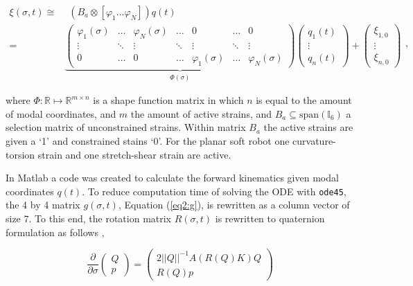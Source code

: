 \begin{equation}
\begin{aligned}
    \xi(\sigma,t) \cong & \hspace{5pt}  (B_a \otimes [ \varphi_1 \dots \varphi_N ])q(t)\\ = &  \underbrace{ \begin{pmatrix}
    \varphi_1(\sigma) & \dots  & \varphi_N(\sigma) & \dots     & 0      & \dots  &  0 \\
    \vdots    & \ddots & \vdots    & \ddots    & \vdots & \ddots & \vdots \\
    0         & \dots  & 0         & \dots     & \varphi_1(\sigma) & \dots & \varphi_N (\sigma)
    \end{pmatrix}}_{\Phi(\sigma)} \begin{pmatrix} q_1(t) \\ \vdots \\ q_n(t) \end{pmatrix} +  \begin{pmatrix} \xi_{1,0} \\ \vdots \\ \xi_{n,0}   \end{pmatrix}
    \end{aligned},
\label{eq2:xishape}
\end{equation}

where $\Phi : \mathbb{R} \mapsto \mathbb{R}^{m \times n}$ is a shape function matrix in which $n$ is equal to the amount of modal coordinates, and $m$ the amount of active strains, and $B_a \subseteq \text{span}(\mathbb{I}_6)$ a selection matrix of unconstrained strains. Within matrix $B_a$ the active strains are given a `1' and constrained stains `0'. For the planar soft robot one curvature-torsion strain and one stretch-shear strain are active. 


In Matlab \cite{MATLAB2020} a code was created to calculate the forward kinematics given modal coordinates $q(t)$. To reduce computation time of solving the ODE with \verb+ode45+, the 4 by 4 matrix $g(\sigma,t)$, Equation (\ref{eq2:g}), is rewritten as a column vector of size 7. To this end, the rotation matrix $R(\sigma,t)$ is rewritten to quaternion formulation as follows \cite{Boyer2019},


\begin{equation}
\frac{\partial}{\partial \sigma}    \begin{pmatrix} Q \\ p \end{pmatrix} = \begin{pmatrix} 2 ||Q||^{-1} A(R(Q)K)Q \\ R(Q)p \end{pmatrix}
\label{eq2:Qp}
\end{equation}

